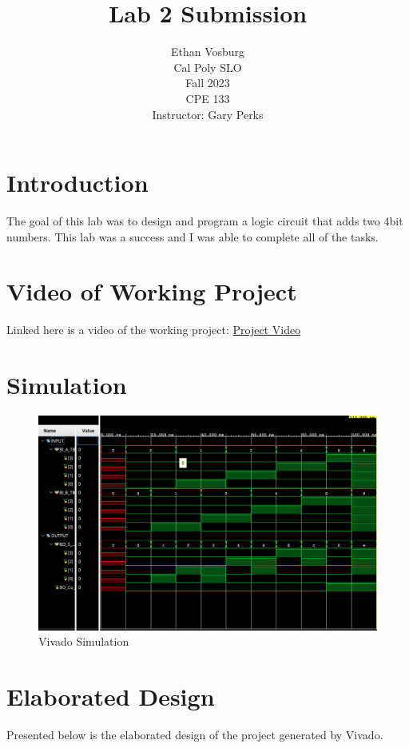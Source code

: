 \documentclass[12pt]{article}
\title{Lab 2 Submission}
\author{Ethan Vosburg\\
    Cal Poly SLO \\
    Fall 2023\\
    CPE 133\\
    Instructor: Gary Perks
}
\begin{document}
\maketitle

\newpage

\section{Introduction}

The goal of this lab was to design and program a logic circuit that adds two 4bit numbers. This lab was a success and I was able to complete all of the tasks.

\section{Video of Working Project}

Linked here is a video of the working project: \href{https://youtu.be/JdKlsTQ8JHU}{Project Video}

\section{Simulation}

\begin{figure}[h]
    \centering
    \includegraphics[width=.8\textwidth]{Figures/CPE 133 Lab 2 Simulation.png}
    \caption{Vivado Simulation}
    \label{fig:simulation}
\end{figure}

\section{Elaborated Design}

Presented below is the elaborated design of the project generated by Vivado.
\end{document}
